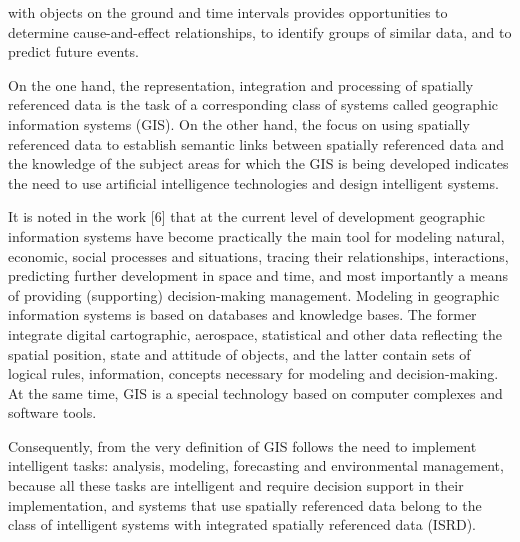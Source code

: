 \documentclass[10pt, letterpaper, twoside]{article}
\begin{document}
\setcounter{page}{196}
\begin{multicols}{2}
 with objects on the ground and time intervals provides
opportunities to determine cause-and-effect relationships,
to identify groups of similar data, and to predict future
events.

On the one hand, the representation, integration and
processing of spatially referenced data is the task of a
corresponding class of systems called geographic information systems (GIS). On the other hand, the focus on
using spatially referenced data to establish semantic links
between spatially referenced data and the knowledge of
the subject areas for which the GIS is being developed indicates the need to use artificial intelligence technologies
and design intelligent systems.

It is noted in the work [6] that at the current level
of development geographic information systems have
become practically the main tool for modeling natural,
economic, social processes and situations, tracing their
relationships, interactions, predicting further development in space and time, and most importantly a means
of providing (supporting) decision-making management.
Modeling in geographic information systems is based
on databases and knowledge bases. The former integrate
digital cartographic, aerospace, statistical and other data
reflecting the spatial position, state and attitude of objects,
and the latter contain sets of logical rules, information,
concepts necessary for modeling and decision-making.
At the same time, GIS is a special technology based on
computer complexes and software tools.

Consequently, from the very definition of GIS follows
the need to implement intelligent tasks: analysis, modeling, forecasting and environmental management, because
all these tasks are intelligent and require decision support
in their implementation, and systems that use spatially
referenced data belong to the class of intelligent systems
with integrated spatially referenced data (ISRD).


\end{multicols}
\end{document}
